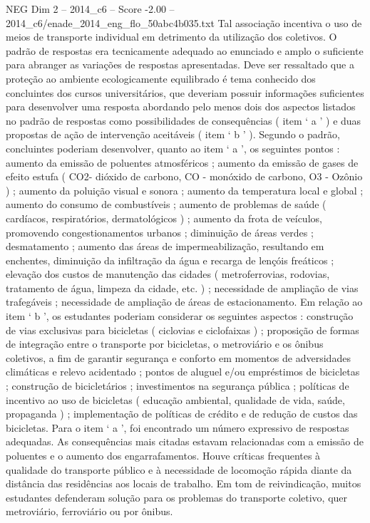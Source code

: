 \begin{textsample}{NEG Dim 2 – 2014\_c6 – Score -2.00 – 2014\_c6/enade\_2014\_eng\_flo\_50abc4b035.txt}
Tal associação incentiva o uso de meios de transporte individual em detrimento da utilização dos coletivos.
O padrão de respostas era tecnicamente adequado ao enunciado e amplo o suficiente para abranger as variações de respostas apresentadas.
Deve ser ressaltado que a proteção ao ambiente ecologicamente equilibrado é tema conhecido dos concluintes dos cursos universitários, que deveriam possuir informações suficientes para desenvolver uma resposta abordando pelo menos dois dos aspectos listados no padrão de respostas como possibilidades de consequências ( item ‘ a ’ ) e duas propostas de ação de intervenção aceitáveis ( item ‘ b ’ ).
Segundo o padrão, concluintes poderiam desenvolver, quanto ao item ‘ a ’, os seguintes pontos : aumento da emissão de poluentes atmosféricos ; aumento da emissão de gases de efeito estufa ( CO2- dióxido de carbono, CO - monóxido de carbono, O3 - Ozônio ) ; aumento da poluição visual e sonora ; aumento da temperatura local e global ; aumento do consumo de combustíveis ; aumento de problemas de saúde ( cardíacos, respiratórios, dermatológicos ) ; aumento da frota de veículos, promovendo congestionamentos urbanos ; diminuição de áreas verdes ; desmatamento ; aumento das áreas de impermeabilização, resultando em enchentes, diminuição da infiltração da água e recarga de lençóis freáticos ; elevação dos custos de manutenção das cidades ( metroferrovias, rodovias, tratamento de água, limpeza da cidade, etc. ) ; necessidade de ampliação de vias trafegáveis ; necessidade de ampliação de áreas de estacionamento.
Em relação ao item ‘ b ’, os estudantes poderiam considerar os seguintes aspectos : construção de vias exclusivas para bicicletas ( ciclovias e ciclofaixas ) ; proposição de formas de integração entre o transporte por bicicletas, o metroviário e os ônibus coletivos, a fim de garantir segurança e conforto em momentos de adversidades climáticas e relevo acidentado ; pontos de aluguel e/ou empréstimos de bicicletas ; construção de bicicletários ; investimentos na segurança pública ; políticas de incentivo ao uso de bicicletas ( educação ambiental, qualidade de vida, saúde, propaganda ) ; implementação de políticas de crédito e de redução de custos das bicicletas.
Para o item ‘ a ’, foi encontrado um número expressivo de respostas adequadas.
As consequências mais citadas estavam relacionadas com a emissão de poluentes e o aumento dos engarrafamentos.
Houve críticas frequentes à qualidade do transporte público e à necessidade de locomoção rápida diante da distância das residências aos locais de trabalho.
Em tom de reivindicação, muitos estudantes defenderam solução para os problemas do transporte coletivo, quer metroviário, ferroviário ou por ônibus.

\end{textsample}
